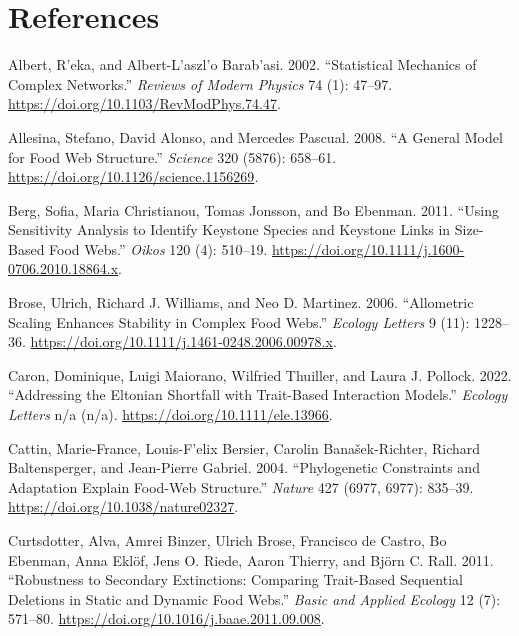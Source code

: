 \documentclass{article}
\newlength{\cslhangindent}
\newlength{\cslentryspacingunit} %
\newenvironment{CSLReferences}[2] %
 {%
  \setlength{\parindent}{0pt}
  \ifodd #1
  \let\oldpar\par
  \def\par{\hangindent=\cslhangindent\oldpar}
  \fi
  \setlength{\parskip}{#2\cslentryspacingunit}
 }%
 {}
\begin{document}
\hypertarget{references}{%
\section*{References}\label{references}}

\hypertarget{refs}{}
\begin{CSLReferences}{1}{0}
\leavevmode{}%
Albert, R'eka, and Albert-L'aszl'o Barab'asi. 2002. {``Statistical
Mechanics of Complex Networks.''} \emph{Reviews of Modern Physics} 74
(1): 47--97. \url{https://doi.org/10.1103/RevModPhys.74.47}.

\leavevmode{}%
Allesina, Stefano, David Alonso, and Mercedes Pascual. 2008. {``A
{General Model} for {Food Web Structure}.''} \emph{Science} 320 (5876):
658--61. \url{https://doi.org/10.1126/science.1156269}.

\leavevmode{}%
Berg, Sofia, Maria Christianou, Tomas Jonsson, and Bo Ebenman. 2011.
{``Using Sensitivity Analysis to Identify Keystone Species and Keystone
Links in Size-Based Food Webs.''} \emph{Oikos} 120 (4): 510--19.
\url{https://doi.org/10.1111/j.1600-0706.2010.18864.x}.

\leavevmode{}%
Brose, Ulrich, Richard J. Williams, and Neo D. Martinez. 2006.
{``Allometric Scaling Enhances Stability in Complex Food Webs.''}
\emph{Ecology Letters} 9 (11): 1228--36.
\url{https://doi.org/10.1111/j.1461-0248.2006.00978.x}.

\leavevmode{}%
Caron, Dominique, Luigi Maiorano, Wilfried Thuiller, and Laura J.
Pollock. 2022. {``Addressing the {Eltonian} Shortfall with Trait-Based
Interaction Models.''} \emph{Ecology Letters} n/a (n/a).
\url{https://doi.org/10.1111/ele.13966}.

\leavevmode{}%
Cattin, Marie-France, Louis-F'elix Bersier, Carolin Banašek-Richter,
Richard Baltensperger, and Jean-Pierre Gabriel. 2004. {``Phylogenetic
Constraints and Adaptation Explain Food-Web Structure.''} \emph{Nature}
427 (6977, 6977): 835--39. \url{https://doi.org/10.1038/nature02327}.

\leavevmode{}%
Curtsdotter, Alva, Amrei Binzer, Ulrich Brose, Francisco de Castro, Bo
Ebenman, Anna Eklöf, Jens O. Riede, Aaron Thierry, and Björn C. Rall.
2011. {``Robustness to Secondary Extinctions: {Comparing} Trait-Based
Sequential Deletions in Static and Dynamic Food Webs.''} \emph{Basic and
Applied Ecology} 12 (7): 571--80.
\url{https://doi.org/10.1016/j.baae.2011.09.008}.


\end{CSLReferences}
\end{document}
